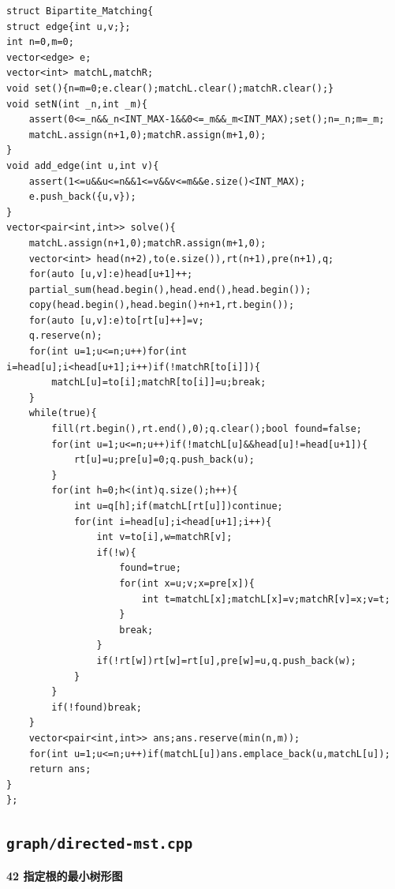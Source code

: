 \documentclass[UTF8,a4paper,10pt]{ctexart}
\begin{document}
\begin{lstlisting}[firstnumber=1]
struct Bipartite_Matching{
struct edge{int u,v;};
int n=0,m=0;
vector<edge> e;
vector<int> matchL,matchR;
void set(){n=m=0;e.clear();matchL.clear();matchR.clear();}
void setN(int _n,int _m){
	assert(0<=_n&&_n<INT_MAX-1&&0<=_m&&_m<INT_MAX);set();n=_n;m=_m;
	matchL.assign(n+1,0);matchR.assign(m+1,0);
}
void add_edge(int u,int v){
	assert(1<=u&&u<=n&&1<=v&&v<=m&&e.size()<INT_MAX);
	e.push_back({u,v});
}
vector<pair<int,int>> solve(){
	matchL.assign(n+1,0);matchR.assign(m+1,0);
	vector<int> head(n+2),to(e.size()),rt(n+1),pre(n+1),q;
	for(auto [u,v]:e)head[u+1]++;
	partial_sum(head.begin(),head.end(),head.begin());
	copy(head.begin(),head.begin()+n+1,rt.begin());
	for(auto [u,v]:e)to[rt[u]++]=v;
	q.reserve(n);
	for(int u=1;u<=n;u++)for(int i=head[u];i<head[u+1];i++)if(!matchR[to[i]]){
		matchL[u]=to[i];matchR[to[i]]=u;break;
	}
	while(true){
		fill(rt.begin(),rt.end(),0);q.clear();bool found=false;
		for(int u=1;u<=n;u++)if(!matchL[u]&&head[u]!=head[u+1]){
			rt[u]=u;pre[u]=0;q.push_back(u);
		}
		for(int h=0;h<(int)q.size();h++){
			int u=q[h];if(matchL[rt[u]])continue;
			for(int i=head[u];i<head[u+1];i++){
				int v=to[i],w=matchR[v];
				if(!w){
					found=true;
					for(int x=u;v;x=pre[x]){
						int t=matchL[x];matchL[x]=v;matchR[v]=x;v=t;
					}
					break;
				}
				if(!rt[w])rt[w]=rt[u],pre[w]=u,q.push_back(w);
			}
		}
		if(!found)break;
	}
	vector<pair<int,int>> ans;ans.reserve(min(n,m));
	for(int u=1;u<=n;u++)if(matchL[u])ans.emplace_back(u,matchL[u]);
	return ans;
}
};
\end{lstlisting}
\par\vspace{1em}
\subsection{\texttt{graph/directed-mst.cpp}}
\textbf{42 指定根的最小树形图}
\end{document}
